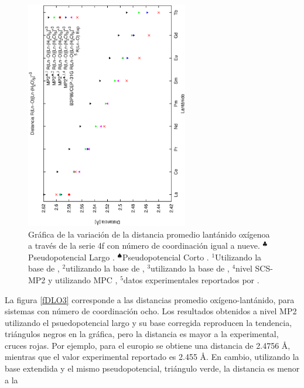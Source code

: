 \begin{figure}[h]
\centering
\includegraphics[height=10cm,angle=-90]{Graficas/lnO9dist2.ps}
\caption{\small{Gr\'afica de la variaci\'on de la distancia promedio
lant\'anido ox\'igenoa a trav\'es de la serie 4f con n\'umero de 
coordinaci\'on igual a nueve. $^{\clubsuit}$Pseudopotencial Largo 
\citep{Dolg1989}. $^{\spadesuit}$Pseudopotencial Corto 
\citep{Cao2001}. $^1$Utilizando la base de \cite{Dolg1993}}, 
$^2$utilizando la base de \cite{Yang2005}, $^3$utilizando la base de 
\cite{Cao2002}, $^4$nivel SCS-MP2 \citep{Grim2003} y utilizando MPC 
\citep{Toma2005}, $^5$datos experimentales reportados por 
\cite{Dang2012}.}
\label{fDLO2}
\end{figure}
La figura \ref{fDLO3} corresponde a las distancias promedio
ox\'igeno-lant\'anido, para sistemas con n\'umero de coordinaci\'on 
ocho. Los resultados obtenidos a nivel MP2 utilizando el 
psuedopotencial largo \citep{Dolg1989} y su base corregida 
\citep{Dolg1993} reproducen la tendencia, tri\'angulos 
negros en la gr\'afica, pero la distancia es mayor a la experimental,
cruces rojas. Por ejemplo, para el europio se obtiene una distancia de
2.4756 \AA, mientras que el valor experimental reportado es 2.455 \AA.
En cambio, utilizando la base extendida \citep{Yang2005} y el mismo 
pseudopotencial, tri\'angulo verde, la distancia es menor a la 
